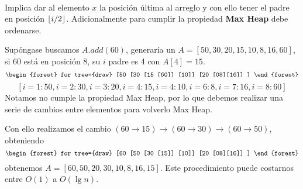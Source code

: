 \documentclass[tikz,11pt,fleqn]{book} %
\begin{document}
\begin{theorem}~\\
	Implica dar al elemento $x$ la posición última al arreglo y con ello tener el padre en posición $\left\lfloor i/2 \right\rfloor$.
	Adicionalmente para cumplir la propiedad \textbf{Max Heap} debe ordenarse.

	Supóngase buscamos $A.add(60)$, generaría un $A=[50,30,20,15,10,8,16,60]$, si 60 está en posición 8, su $i$ padre es 4 con $A[4]=15$.
	$$\begin{forest}
			for tree={draw}
			[50
				[30
						[15
								[60]]
						[10]]
				[20
						[08][16]]
			]
		\end{forest}$$
	$$
		[i=1:50,i=2:30,i=3:20,i=4:15,i=4:10,i=6:8,i=7:16,i=8:60]
	$$
	Notamos no cumple la propiedad Max Heap, por lo que debemos realizar una serie de cambios entre elementos para volverlo Max Heap.

	Con ello realizamos el cambio $(60\to15)\to(60\to30)\to(60\to50)$, obteniendo
	$$\begin{forest}
			for tree={draw}
			[60
				[50
						[30
								[15]]
						[10]]
				[20
						[08][16]]
			]
		\end{forest}$$
	obtenemos $A=[60,50,20,30,10,8,16,15]$. Este procedimiento puede costarnos entre $O(1)$ a $O(\lg n)$.
\end{theorem}
\end{document}
